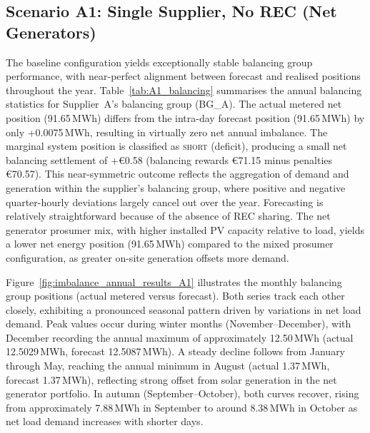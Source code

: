 \subsection{Scenario A1: Single Supplier, No REC (Net Generators)}
\label{sec:results_A1}

The baseline configuration yields exceptionally stable balancing group performance, with near-perfect alignment between forecast and realised positions throughout the year. Table~\ref{tab:A1_balancing} summarises the annual balancing statistics for Supplier~A's balancing group (BG\_A). The actual metered net position (91.65\,MWh) differs from the intra-day forecast position (91.65\,MWh) by only +0.0075\,MWh, resulting in virtually zero net annual imbalance. The marginal system position is classified as \textsc{short} (deficit), producing a small net balancing settlement of +€0.58 (balancing rewards €71.15 minus penalties €70.57). This near-symmetric outcome reflects the aggregation of demand and generation within the supplier's balancing group, where positive and negative quarter-hourly deviations largely cancel out over the year. Forecasting is relatively straightforward because of the absence of REC sharing. The net generator prosumer mix, with higher installed PV capacity relative to load, yields a lower net energy position (91.65\,MWh) compared to the mixed prosumer configuration, as greater on-site generation offsets more demand.

Figure~\ref{fig:imbalance_annual_results_A1} illustrates the monthly balancing group positions (actual metered versus forecast). Both series track each other closely, exhibiting a pronounced seasonal pattern driven by variations in net load demand. Peak values occur during winter months (November--December), with December recording the annual maximum of approximately 12.50\,MWh (actual 12.5029\,MWh, forecast 12.5087\,MWh). A steady decline follows from January through May, reaching the annual minimum in August (actual 1.37\,MWh, forecast 1.37\,MWh), reflecting strong offset from solar generation in the net generator portfolio. In autumn (September--October), both curves recover, rising from approximately 7.88\,MWh in September to around 8.38\,MWh in October as net load demand increases with shorter days.

